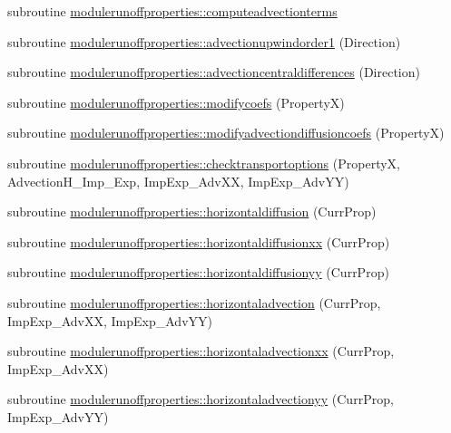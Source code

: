 \begin{DoxyCompactItemize}
subroutine \mbox{\hyperlink{namespacemodulerunoffproperties_a661de168b780c51098cc52f20f85f34b}{modulerunoffproperties\+::computeadvectionterms}}
\item 
subroutine \mbox{\hyperlink{namespacemodulerunoffproperties_a6a694f9a334a389bdaca97db0bbc2f7b}{modulerunoffproperties\+::advectionupwindorder1}} (Direction)
\item 
subroutine \mbox{\hyperlink{namespacemodulerunoffproperties_addd3719940508b59af78d352984c8274}{modulerunoffproperties\+::advectioncentraldifferences}} (Direction)
\item 
subroutine \mbox{\hyperlink{namespacemodulerunoffproperties_ab43247d321857ac09aa5d9ef97891cd1}{modulerunoffproperties\+::modifycoefs}} (PropertyX)
\item 
subroutine \mbox{\hyperlink{namespacemodulerunoffproperties_ae48417d5192871ed023a556976f13a89}{modulerunoffproperties\+::modifyadvectiondiffusioncoefs}} (PropertyX)
\item 
subroutine \mbox{\hyperlink{namespacemodulerunoffproperties_a5f610fc72802ac17615405bcd3f2f930}{modulerunoffproperties\+::checktransportoptions}} (PropertyX, Advection\+H\+\_\+\+Imp\+\_\+\+Exp, Imp\+Exp\+\_\+\+Adv\+XX, Imp\+Exp\+\_\+\+Adv\+YY)
\item 
subroutine \mbox{\hyperlink{namespacemodulerunoffproperties_af92ead42cead9acb2a8896534d8d3dfb}{modulerunoffproperties\+::horizontaldiffusion}} (Curr\+Prop)
\item 
subroutine \mbox{\hyperlink{namespacemodulerunoffproperties_aa14d5eb72e2b9e8e165bfbb537331410}{modulerunoffproperties\+::horizontaldiffusionxx}} (Curr\+Prop)
\item 
subroutine \mbox{\hyperlink{namespacemodulerunoffproperties_a4725654ec67f2fac23c7df49fb984a0e}{modulerunoffproperties\+::horizontaldiffusionyy}} (Curr\+Prop)
\item 
subroutine \mbox{\hyperlink{namespacemodulerunoffproperties_a88919c7edf33d9d985c9378f1d5a24f9}{modulerunoffproperties\+::horizontaladvection}} (Curr\+Prop, Imp\+Exp\+\_\+\+Adv\+XX, Imp\+Exp\+\_\+\+Adv\+YY)
\item 
subroutine \mbox{\hyperlink{namespacemodulerunoffproperties_add33ed1dc6829db881e5d276d5354ef8}{modulerunoffproperties\+::horizontaladvectionxx}} (Curr\+Prop, Imp\+Exp\+\_\+\+Adv\+XX)
\item 
subroutine \mbox{\hyperlink{namespacemodulerunoffproperties_a23a3ece2ec9c5af37ce26d5c50ba1c03}{modulerunoffproperties\+::horizontaladvectionyy}} (Curr\+Prop, Imp\+Exp\+\_\+\+Adv\+YY)
\item 

\end{DoxyCompactItemize}
